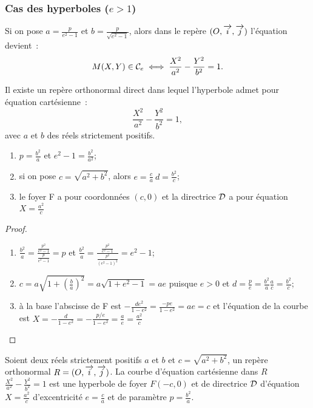 \subsubsection{Cas des hyperboles (\(e>1\))}
Si on pose \(a = \frac{p}{e^2-1}\) et \(b = \frac{p}{\sqrt{e^2-1}}\), alors dans le
repère \((O,\overrightarrow{i},\overrightarrow{j})\) l'équation devient~:
\begin{equation}
  M(X, Y) \in \mathcal{C}_{e} \iff \frac{X^2}{a^2}-\frac{Y^2}{b^2} = 1.
\end{equation}
\begin{theo}
  Il existe un repère orthonormal direct dans lequel l'hyperbole admet pour
  équation cartésienne~:
  \begin{equation}
    \frac{X^2}{a^2}-\frac{Y^2}{b^2} = 1,
  \end{equation}
  avec \(a\) et \(b\) des réels strictement positifs.
\end{theo}
\begin{prop}
  \begin{enumerate}
    \item \(p = \frac{b^2}{a}\) et \(e^2-1 = \frac{b^2}{a^2}\);
    \item si on pose \(c = \sqrt{a^2 + b^2}\), alors \(e = \frac{c}{a} \
      d = \frac{b^2}{c}\);
    \item le foyer F a pour coordonnées \((c, 0)\) et la directrice \(\mathcal{D}\) a
      pour équation \(X = \frac{a^2}{c}\)
  \end{enumerate}
\end{prop}
\begin{proof}
  \begin{enumerate}
    \item \(\frac{b^2}{a} = \frac{\frac{p^2}{e^2-1}}{\frac{p}{e^2-1}} = p\) et
      \(\frac{b^2}{a} = \frac{\frac{p^2}{e^2-1}}{\frac{p^2}{(e^2-1)^2}} = e^2-1\);
    \item \(c = a\sqrt{1 + \left(\frac{b}{a}\right)^2} = a\sqrt{1 + e^2-1} = ae\) puisque
      \(e>0\) et \(d = \frac{p}{e} = \frac{b^2}{a} \frac{a}{c} = \frac{b^2}{c}\);
    \item à la base l'abscisse de F est
      \(-\frac{de^2}{1-e^2} = \frac{-pe}{1-e^2} = ae = c\) et l'équation de la courbe
      est \(X = -\frac{d}{1-e^2} = -\frac{p/e}{1-e^2} = \frac{a}{e} = \frac{a^2}{c}\)
  \end{enumerate}
\end{proof}
\begin{theo}
  Soient deux réels strictement positifs \(a\) et \(b\) et \(c = \sqrt{a^2 + b^2}\),
  un repère orthonormal \(R = (O,\overrightarrow{i},\overrightarrow{j})\). La courbe d'équation cartésienne dans \(R\)
  \(\frac{X^2}{a^2}-\frac{Y^2}{b^2} = 1\) est une hyperbole de foyer \(F(-c, 0)\)
  et de directrice \(\mathcal{D}\) d'équation \(X = \frac{a^2}{c}\) d'excentricité
  \(e = \frac{c}{a}\) et de paramètre \(p = \frac{b^2}{a}\).
\end{theo}
